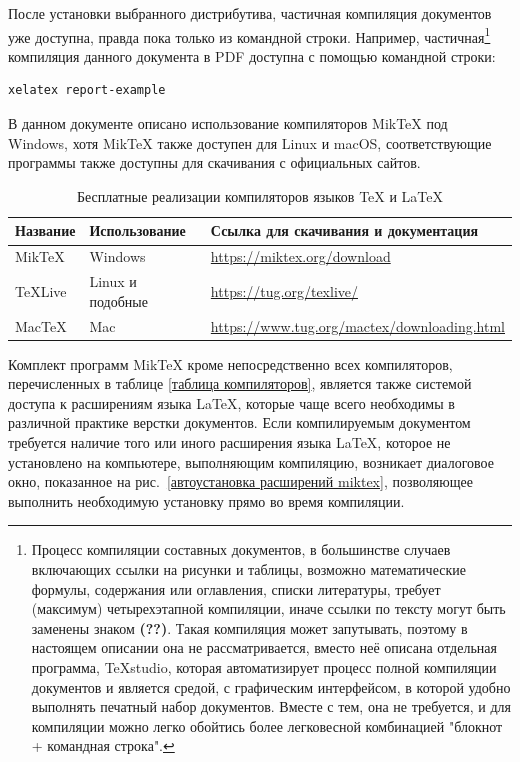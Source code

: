 \documentclass[workbook]{fefudoc}
\begin{document}
После установки выбранного дистрибутива, частичная компиляция документов уже доступна, правда пока только из командной строки.
Например,
частичная\footnote{Процесс компиляции составных документов, в большинстве случаев включающих ссылки на рисунки и таблицы, возможно математические формулы, содержания или оглавления, списки литературы, требует (максимум) четырехэтапной компиляции, иначе ссылки по тексту могут быть заменены знаком \textbf{(??)}. Такая компиляция может запутывать, поэтому в настоящем описании она не рассматривается, вместо неё описана отдельная программа, TeXstudio, которая автоматизирует процесс полной компиляции документов и является средой, с графическим интерфейсом, в которой удобно выполнять печатный набор документов. Вместе с тем, она не требуется, и для компиляции можно легко обойтись более легковесной комбинацией "блокнот + командная строка".}
компиляция данного документа в PDF доступна с помощью командной строки:
\begin{lstlisting}
xelatex report-example
\end{lstlisting}

В данном документе описано использование компиляторов MikTeX под Windows, хотя MikTeX также доступен для Linux и macOS, соответствующие программы также доступны для скачивания с официальных сайтов.

\begin{table}\small
\centering
\caption{Бесплатные реализации компиляторов языков \TeX{} и \LaTeX{}}
\label{таблица дистрибутивов}
\begin{tabularx}{\textwidth}{|l|l|X|}
\hline
\textbf{Название} & \textbf{Использование} & \textbf{Ссылка для скачивания и документация}     \\ \hline
MikTeX            & Windows                & \url{https://miktex.org/download}                 \\ \hline
TeXLive           & Linux и подобные       & \url{https://tug.org/texlive/}                    \\ \hline
MacTeX            & Mac                    & \url{https://www.tug.org/mactex/downloading.html} \\ \hline
\end{tabularx}
\end{table}

Комплект программ MikTeX кроме непосредственно всех компиляторов, перечисленных в таблице \ref{таблица компиляторов}, является также системой доступа к расширениям языка \LaTeX{}, которые чаще всего необходимы в различной практике верстки документов.
Если компилируемым документом требуется наличие того или иного расширения языка \LaTeX, которое не установлено на компьютере, выполняющим компиляцию, возникает диалоговое окно, показанное на рис.~\ref{автоустановка расширений miktex}, позволяющее выполнить необходимую установку прямо во время компиляции.
\end{document}
